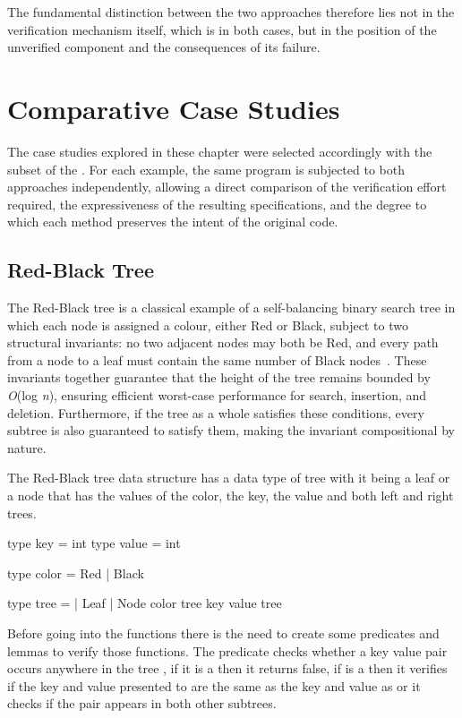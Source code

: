 The fundamental distinction between the two approaches therefore lies not in the verification mechanism itself, which is \whythree in both cases, but in the position 
of the unverified component and the consequences of its failure.

\section{Comparative Case Studies}

The case studies explored in these chapter were selected accordingly with the subset of the \whyml. For each example, the same 
program is subjected to both approaches independently, allowing a direct comparison of the verification effort required, the 
expressiveness of the resulting specifications, and the degree to which each method preserves the intent of the original code.

\subsection{Red-Black Tree}

The Red-Black tree is a classical example of a self-balancing binary search tree in which each node is assigned a colour, either 
Red or Black, subject to two structural invariants: no two adjacent nodes may both be Red, and every path from a node to a 
leaf must contain the same number of Black nodes~\cite{Guibas1978}. These invariants together guarantee that the height of the tree remains bounded 
by \textit{O}(log \textit{n}), ensuring efficient worst-case performance for search, insertion, and deletion. Furthermore, if 
the tree as a whole satisfies these conditions, every subtree is also guaranteed to satisfy them, making the invariant compositional by nature.

The Red-Black tree data structure has a data type of tree with it being a leaf or a node that has the values of the color,
the key, the value and both left and right trees.

\begin{whylang}
    type key = int
    type value = int

    type color = Red | Black

    type tree =
        | Leaf
        | Node color tree key value tree
\end{whylang}

Before going into the functions there is the need to create some predicates and lemmas to verify those functions. 
The predicate 
checks whether a key value pair  occurs anywhere in the tree , if it is a  then it returns false, 
if  is a  then it verifies if the key and value presented to  are the same as the key and value as
 or it checks if the pair appears in both other subtrees.

